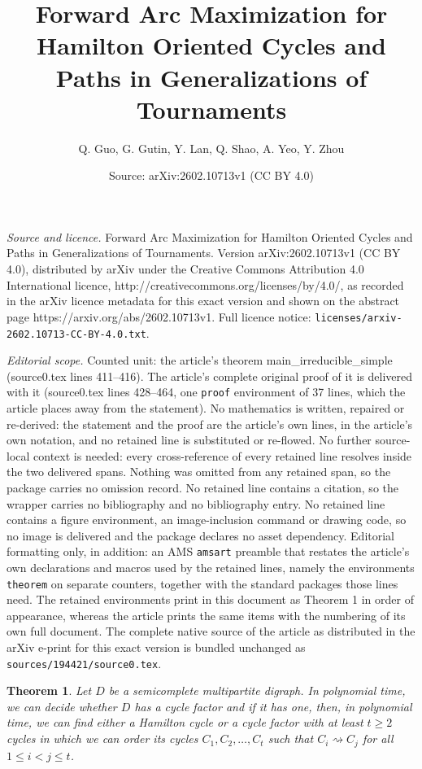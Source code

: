 \documentclass[10pt,a4paper]{amsart}
\title{Forward Arc Maximization for Hamilton Oriented Cycles and Paths in Generalizations of Tournaments}
\author{Q. Guo, G. Gutin, Y. Lan, Q. Shao, A. Yeo, Y. Zhou}
\date{Source: arXiv:2602.10713v1 (CC BY 4.0)}
\newtheorem{theorem}{Theorem}
\newcommand{\GGnn}[1]{{#1}}
\newcommand{\wdom}[1]{\rightsquigarrow}
\begin{document}
\maketitle

\noindent\emph{Source and licence.} Forward Arc Maximization for Hamilton Oriented Cycles and Paths in Generalizations of Tournaments. Version arXiv:2602.10713v1 (CC BY 4.0), distributed by arXiv under the Creative Commons Attribution 4.0 International licence, http://creativecommons.org/licenses/by/4.0/, as recorded in the arXiv licence metadata for this exact version and shown on the abstract page https://arxiv.org/abs/2602.10713v1. Full licence notice: \texttt{licenses/arxiv-2602.10713-CC-BY-4.0.txt}.\par\smallskip

\noindent\textit{Editorial scope.} Counted unit: the article's theorem main\_irreducible\_simple (source0.tex lines 411--416). The article's complete original proof of it is delivered with it (source0.tex lines 428--464, one \texttt{proof} environment of 37 lines, which the article places away from the statement). No mathematics is written, repaired or re-derived: the statement and the proof are the article's own lines, in the article's own notation, and no retained line is substituted or re-flowed.  No further source-local context is needed: every cross-reference of every retained line resolves inside the two delivered spans.  Nothing was omitted from any retained span, so the package carries no omission record.  No retained line contains a citation, so the wrapper carries no bibliography and no bibliography entry.  No retained line contains a figure environment, an image-inclusion command or drawing code, so no image is delivered and the package declares no asset dependency.  Editorial formatting only, in addition: an AMS \texttt{amsart} preamble that restates the article's own declarations and macros used by the retained lines, namely the environments \texttt{theorem} on separate counters, together with the standard packages those lines need.  The retained environments print in this document as Theorem 1 in order of appearance, whereas the article prints the same items with the numbering of its own full document.  The complete native source of the article as distributed in the arXiv e-print for this exact version is bundled unchanged as \texttt{sources/194421/source0.tex}.
\begin{theorem}\label{main_irreducible_simple}
Let $D$ be a semicomplete multipartite digraph. \GGnn{In polynomial time, we can decide whether $D$ has a cycle factor and if it has one, then, in polynomial time, we can find either a Hamilton cycle  or a cycle factor with at least $t\ge 2$ cycles in which we can order its cycles $C_1,C_2,\ldots, C_t$ such that 
$C_i \wdom{} C_j$ for all $1 \leq i < j \leq t$.}
\end{theorem}
\end{document}
